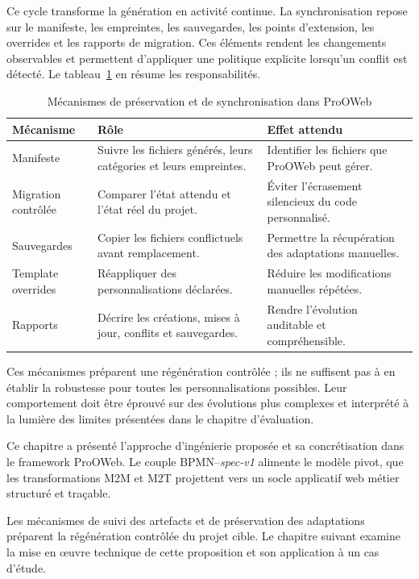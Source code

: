 Ce cycle transforme la génération en activité continue. La synchronisation
repose sur le manifeste, les empreintes, les sauvegardes, les points d'extension,
les overrides et les rapports de migration. Ces éléments rendent les changements
observables et permettent d'appliquer une politique explicite lorsqu'un conflit
est détecté. Le tableau~\ref{tab:chap3-preservation-synchronisation} en résume les
responsabilités.

\begin{table}[H]
\centering
\caption{Mécanismes de préservation et de synchronisation dans ProOWeb}
\label{tab:chap3-preservation-synchronisation}
\begin{tabularx}{\textwidth}{p{3.8cm}p{5.0cm}X}
\toprule
\textbf{Mécanisme} & \textbf{Rôle} & \textbf{Effet attendu} \\
\midrule
Manifeste & Suivre les fichiers générés, leurs catégories et leurs empreintes. & Identifier les fichiers que ProOWeb peut gérer. \\
Migration contrôlée & Comparer l'état attendu et l'état réel du projet. & Éviter l'écrasement silencieux du code personnalisé. \\
Sauvegardes & Copier les fichiers conflictuels avant remplacement. & Permettre la récupération des adaptations manuelles. \\
Template overrides & Réappliquer des personnalisations déclarées. & Réduire les modifications manuelles répétées. \\
Rapports & Décrire les créations, mises à jour, conflits et sauvegardes. & Rendre l'évolution auditable et compréhensible. \\
\bottomrule
\end{tabularx}
\end{table}

Ces mécanismes préparent une régénération contrôlée ; ils ne suffisent pas à en
établir la robustesse pour toutes les personnalisations possibles. Leur
comportement doit être éprouvé sur des évolutions plus complexes et interprété à
la lumière des limites présentées dans le chapitre d'évaluation.


Ce chapitre a présenté l'approche d'ingénierie proposée et sa concrétisation dans
le framework ProOWeb. Le couple BPMN--\textit{spec-v1} alimente le modèle pivot,
que les transformations M2M et M2T projettent vers un socle applicatif web métier
structuré et traçable.

Les mécanismes de suivi des artefacts et de préservation des adaptations
préparent la régénération contrôlée du projet cible. Le chapitre suivant examine
la mise en œuvre technique de cette proposition et son application à un cas
d'étude.
